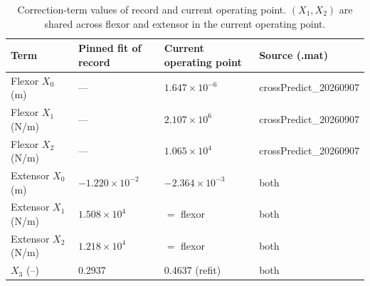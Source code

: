 \begin{table}[htbp]
\caption{Correction-term values of record and current operating point. $(X_{1}, X_{2})$ are shared across flexor and extensor in the current operating point.}
\label{tab:app_xi_values}
\begin{tabular}{@{}llll@{}}
\toprule
\textbf{Term} & \textbf{Pinned fit of record} & \textbf{Current operating point} & \textbf{Source (.mat)} \\
\midrule
Flexor $X_{0}$ (m)   & ---                & $1.647\times10^{-6}$ & crossPredict\_20260907 \\
Flexor $X_{1}$ (N/m) & ---                & $2.107\times10^{6}$  & crossPredict\_20260907 \\
Flexor $X_{2}$ (N/m) & ---                & $1.065\times10^{4}$  & crossPredict\_20260907 \\
Extensor $X_{0}$ (m) & $-1.220\times10^{-2}$ & $-2.364\times10^{-3}$ & both \\
Extensor $X_{1}$ (N/m) & $1.508\times10^{4}$ & $= $ flexor        & both \\
Extensor $X_{2}$ (N/m) & $1.218\times10^{4}$ & $= $ flexor        & both \\
$X_{3}$ (--)         & 0.2937             & 0.4637 (refit)       & both \\
\bottomrule
\end{tabular}
\end{table}
